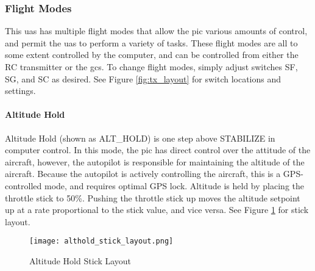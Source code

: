 \documentclass{report}
\begin{document}
			\subsubsection{Flight Modes}
				This \gls{uas} has multiple flight modes that allow the \gls{pic} various amounts of control, and permit the \gls{uas} to perform a variety of tasks.  These flight modes are all to some extent controlled by the computer, and can be controlled from either the RC transmitter or the \gls{gcs}.  To change flight modes, simply adjust switches SF, SG, and SC as desired.  See Figure \ref{fig:tx_layout} for switch locations and settings.


				\paragraph{Altitude Hold}
					Altitude Hold (shown as ALT\_HOLD) is one step above STABILIZE in computer control.  In this mode, the \gls{pic} has direct control over the attitude of the aircraft, however, the autopilot is responsible for maintaining the altitude of the aircraft.  Because the autopilot is actively controlling the aircraft, this is a GPS-controlled mode, and requires optimal GPS lock.  Altitude is held by placing the throttle stick to 50\%.  Pushing the throttle stick up moves the altitude setpoint up at a rate proportional to the stick value, and vice versa.  See Figure \ref{fig:alt_hold_sticks} for stick layout.

					\begin{figure}[ht]
						\centering
						\caption{Altitude Hold Stick Layout}
						\texttt{[image: althold\_stick\_layout.png]}
						\label{fig:alt_hold_sticks}
					\end{figure}
\end{document}

